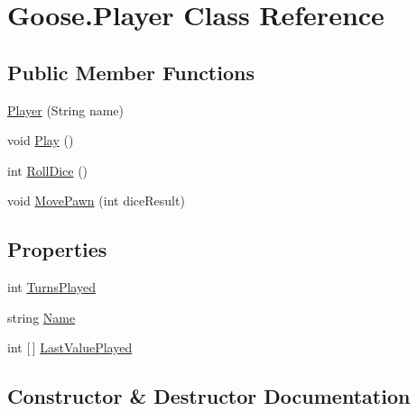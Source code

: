 \hypertarget{class_goose_1_1_player}{}\section{Goose.\+Player Class Reference}
\label{class_goose_1_1_player}
\subsection*{Public Member Functions}
\begin{DoxyCompactItemize}
\item 
\hyperlink{class_goose_1_1_player_a4da88d2798da35aa5f931885585e7e67}{Player} (String name)
\item 
void \hyperlink{class_goose_1_1_player_a52a22592e93b051ee7ad9a9bf0943705}{Play} ()
\item 
int \hyperlink{class_goose_1_1_player_ab5055d50f4965ecf76e14372f5ff3d61}{Roll\+Dice} ()
\item 
void \hyperlink{class_goose_1_1_player_a187622a1a4433fa733ce7b4ae3b1896c}{Move\+Pawn} (int dice\+Result)
\end{DoxyCompactItemize}
\subsection*{Properties}
\begin{DoxyCompactItemize}
\item 
int \hyperlink{class_goose_1_1_player_a92d283c7985cca316deba23e4bb3e1a2}{Turns\+Played}
\item 
string \hyperlink{class_goose_1_1_player_ad35633422c33b82179b4504d3021a4ea}{Name}
\item 
int \mbox{[}$\,$\mbox{]} \hyperlink{class_goose_1_1_player_ac4b5c7e0de51bbc8f9d3d9e4c1447a4c}{Last\+Value\+Played}
\end{DoxyCompactItemize}


\subsection{Constructor \& Destructor Documentation}
\mbox{\label{class_goose_1_1_player_a4da88d2798da35aa5f931885585e7e67}} 
